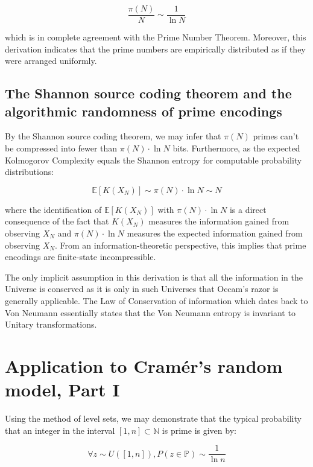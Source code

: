 \documentclass{article}
\begin{document}
\begin{equation}
\frac{\pi(N)}{N} \sim \frac{1}{\ln N}	
\end{equation}

which is in complete agreement with the Prime Number Theorem. Moreover, this derivation indicates that the prime numbers are empirically distributed as if they were arranged uniformly.  

\subsection{The Shannon source coding theorem and the algorithmic randomness of prime encodings}

By the Shannon source coding theorem, we may infer that $\pi(N)$ primes can't be compressed into fewer than $\pi(N) \cdot \ln N$ bits. Furthermore, as the expected Kolmogorov Complexity equals the Shannon entropy for computable probability distributions: 

\begin{equation}
\mathbb{E}[K(X_N)] \sim 	\pi(N) \cdot \ln N \sim N
\end{equation}

where the identification of $\mathbb{E}[K(X_N)]$ with $\pi(N) \cdot \ln N$ is a direct consequence of the fact that $K(X_N)$ measures the information gained from observing $X_N$ and $\pi(N) \cdot \ln N$ measures the expected information gained from observing $X_N$. From an information-theoretic perspective, this implies that prime encodings are finite-state incompressible.

The only implicit assumption in this derivation is that all the information in the Universe is conserved as it is only in such Universes that Occam's razor is generally applicable. The Law of Conservation of information which dates back to Von Neumann essentially states that the Von Neumann entropy is invariant to Unitary transformations. 

\section{Application to Cramér's random model, Part I}

Using the method of level sets, we may demonstrate that the typical probability that an
integer in the interval $[1,n] \subset \mathbb{N}$ is prime is given by:

\begin{equation}
\forall z \sim U([1,n]), P(z \in \mathbb{P}) \sim \frac{1}{\ln n}
\end{equation}
\end{document}
